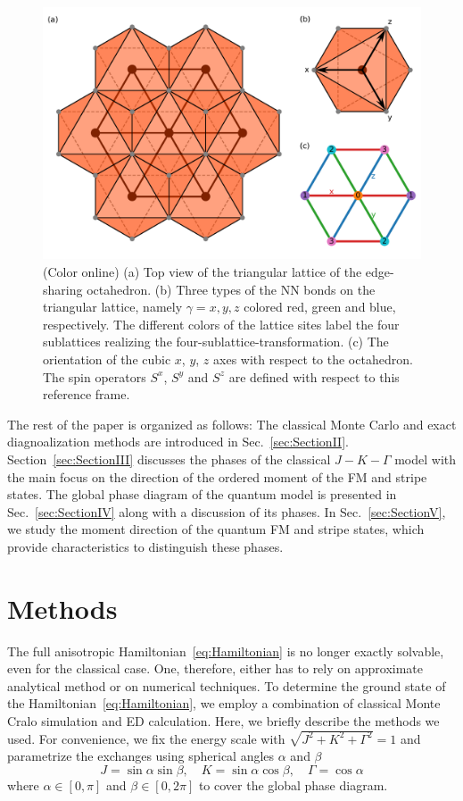\documentclass[aps,prb,reprint,amsfonts,amsmath,amssymb,showpacs,groupedaddress,superscriptaddress]{revtex4-1}
\begin{document}
\begin{figure}
    \includegraphics[width=\columnwidth]{Fig1.pdf}
    \caption{\label{fig:ModelDefinition}(Color online) (a) Top view of the triangular lattice of the edge-sharing octahedron. (b) Three types of the NN bonds on the triangular lattice, namely $\gamma=x, y, z$ colored red, green and blue, respectively. The different colors of the lattice sites label the four sublattices realizing the four-sublattice-transformation. (c) The orientation of the cubic $x$, $y$, $z$ axes with respect to the octahedron. The spin operators $S^x$, $S^y$ and $S^z$ are defined with respect to this reference frame.}
\end{figure}

The rest of the paper is organized as follows: The classical Monte Carlo and exact diagnoalization methods are introduced in Sec.~\ref{sec:SectionII}. Section~\ref{sec:SectionIII} discusses the phases of the classical $J-K-\Gamma$ model with the main focus on the direction of the ordered moment of the FM and stripe states. The global phase diagram of the quantum model is presented in Sec.~\ref{sec:SectionIV} along with a discussion of its phases. In Sec.~\ref{sec:SectionV}, we study the moment direction of the quantum FM and stripe states, which provide characteristics to distinguish these phases.

\section{\label{sec:SectionII}Methods}
The full anisotropic Hamiltonian~\eqref{eq:Hamiltonian} is no longer exactly solvable, even for the classical case. One, therefore, either has to rely on approximate analytical method or on numerical techniques. To determine the ground state of the Hamiltonian~\eqref{eq:Hamiltonian}, we employ a combination of classical Monte Cralo simulation and ED calculation. Here, we briefly describe the methods we used. For convenience, we fix the energy scale with $\sqrt{J^2 + K^2 + \Gamma^2}=1$ and parametrize the exchanges using spherical angles $\alpha$ and $\beta$
\begin{equation}
    J = \sin\alpha \sin\beta, \quad
    K = \sin\alpha \cos\beta, \quad
    \Gamma = \cos\alpha \label{eq:Parameters}
\end{equation}
where $\alpha \in [0, \pi]$ and $\beta \in [0, 2\pi]$ to cover the global phase diagram.
\end{document}

